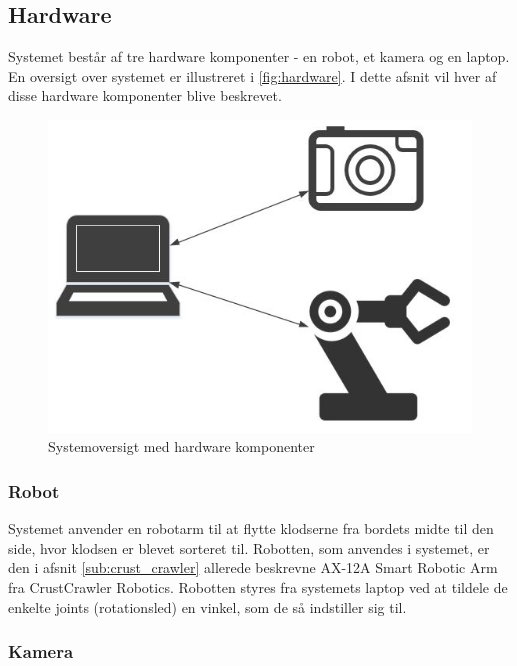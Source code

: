\subsection{Hardware} %
\label{sub:hardware}

Systemet består af tre hardware komponenter - en robot, et kamera og en laptop.
En oversigt over systemet er illustreret i \autoref{fig:hardware}.
I dette afsnit vil hver af disse hardware komponenter blive beskrevet.

\begin{figure}[h]
\centering
\includegraphics[scale=0.5]{images/hardware}
\caption{Systemoversigt med hardware komponenter}
\label{fig:hardware}
\end{figure}

\subsubsection{Robot} %
\label{subsub:robot}

Systemet anvender en robotarm til at flytte klodserne fra bordets midte til den side, hvor klodsen er blevet sorteret til.
Robotten, som anvendes i systemet, er den i afsnit \ref{sub:crust_crawler} allerede beskrevne AX-12A Smart Robotic Arm fra CrustCrawler Robotics.
Robotten styres fra systemets laptop ved at tildele de enkelte joints (rotationsled) en vinkel, som de så indstiller sig til.


\subsubsection{Kamera} %
\label{subsub:camera}

